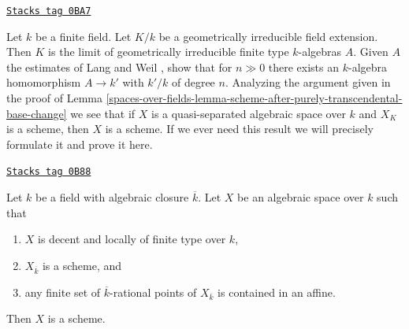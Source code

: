 \begin{remark}
\label{spaces-over-fields-remark-when-does-the-argument-work}
\href{https://stacks.math.columbia.edu/tag/0BA7}{\texttt{Stacks tag 0BA7}}

Let $k$ be a finite field. Let $K/k$ be a geometrically
irreducible field extension. Then $K$ is the limit of geometrically
irreducible finite type $k$-algebras $A$. Given $A$ the estimates
of Lang and Weil \cite{LW}, show that for $n \gg 0$ there exists
an $k$-algebra homomorphism $A \to k'$ with $k'/k$ of degree $n$.
Analyzing the argument given in the proof of
Lemma \ref{spaces-over-fields-lemma-scheme-after-purely-transcendental-base-change}
we see that if $X$ is a quasi-separated algebraic space over $k$
and $X_K$ is a scheme, then $X$ is a scheme. If we ever need this
result we will precisely formulate it and prove it here.
\end{remark}

\begin{lemma}
\label{spaces-over-fields-lemma-scheme-over-algebraic-closure-enough-affines}
\href{https://stacks.math.columbia.edu/tag/0B88}{\texttt{Stacks tag 0B88}}

Let $k$ be a field with algebraic closure $\overline{k}$. Let $X$
be an algebraic space over $k$ such that
\begin{enumerate}
\item $X$ is decent and locally of finite type over $k$,
\item $X_{\overline{k}}$ is a scheme, and
\item any finite set of $\overline{k}$-rational points of $X_{\overline{k}}$
is contained in an affine.
\end{enumerate}
Then $X$ is a scheme.
\end{lemma}

